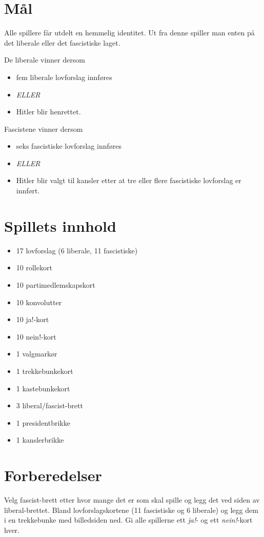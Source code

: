 \documentclass[a4paper, 10pt, twocolumn, twoside]{article}
\begin{document}
\section{Mål}
Alle spillere får utdelt en hemmelig identitet. Ut fra denne spiller man enten på det liberale eller det fascistiske laget.

\parbox{\columnwidth}{
De liberale vinner dersom 
\begin{itemize}
    \item fem liberale lovforslag innføres
    \item[] \textit{\uppercase{eller}}
    \item Hitler blir henrettet.
\end{itemize}
}

\parbox{\columnwidth}{
Fascistene vinner dersom
\begin{itemize}
    \item seks fascistiske lovforslag innføres
    \item[] \textit{\uppercase{eller}}
    \item Hitler blir valgt til kansler etter at tre eller flere fascistiske lovforslag er innført.
\end{itemize}
}
\section{Spillets innhold}
\begin{itemize}
\item 17 lovforslag (6 liberale, 11 fascistiske)
\item 10 rollekort
\item 10 partimedlemskapskort
\item 10 konvolutter
\item 10 ja!-kort
\item 10 nein!-kort
\item 1 valgmarkør
\item 1 trekkebunkekort
\item 1 kastebunkekort
\item 3 liberal/fascist-brett
\item 1 presidentbrikke
\item 1 kanslerbrikke
\end{itemize}

\section{Forberedelser}
Velg fascist-brett etter hvor mange det er som skal spille og legg det ved siden av liberal-brettet. Bland lovforslagskortene (11 fascistiske og 6 liberale) og legg dem i en trekkebunke med billedsiden ned. Gi alle spillerne ett \textit{ja!}- og ett \textit{nein!}-kort hver.
\end{document}
